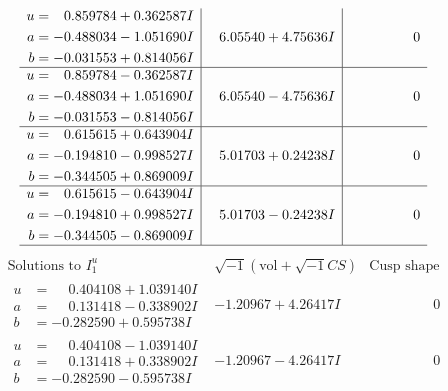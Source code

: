 \documentclass[1p]{elsarticle_modified}
\theoremstyle{definition}
\newcommand{\I}{\sqrt{-1}}
\begin{document}
$$\begin{array}{c|c|c}
\begin{aligned}
u &= \phantom{-}0.859784 + 0.362587 I \\
a &= -0.488034 - 1.051690 I \\
b &= -0.031553 + 0.814056 I\end{aligned}
 & \phantom{-}6.05540 + 4.75636 I & \phantom{-0.000000 } 0 \\ \hline\begin{aligned}
u &= \phantom{-}0.859784 - 0.362587 I \\
a &= -0.488034 + 1.051690 I \\
b &= -0.031553 - 0.814056 I\end{aligned}
 & \phantom{-}6.05540 - 4.75636 I & \phantom{-0.000000 } 0 \\ \hline\begin{aligned}
u &= \phantom{-}0.615615 + 0.643904 I \\
a &= -0.194810 - 0.998527 I \\
b &= -0.344505 + 0.869009 I\end{aligned}
 & \phantom{-}5.01703 + 0.24238 I & \phantom{-0.000000 } 0 \\ \hline\begin{aligned}
u &= \phantom{-}0.615615 - 0.643904 I \\
a &= -0.194810 + 0.998527 I \\
b &= -0.344505 - 0.869009 I\end{aligned}
 & \phantom{-}5.01703 - 0.24238 I & \phantom{-0.000000 } 0\\
 \hline 
 \end{array}$$\newpage$$\begin{array}{c|c|c}  
\text{Solutions to }I^u_{1}& \I (\text{vol} + \sqrt{-1}CS) & \text{Cusp shape}\\
 \hline 
\begin{aligned}
u &= \phantom{-}0.404108 + 1.039140 I \\
a &= \phantom{-}0.131418 - 0.338902 I \\
b &= -0.282590 + 0.595738 I\end{aligned}
 & -1.20967 + 4.26417 I & \phantom{-0.000000 } 0 \\ \hline\begin{aligned}
u &= \phantom{-}0.404108 - 1.039140 I \\
a &= \phantom{-}0.131418 + 0.338902 I \\
b &= -0.282590 - 0.595738 I\end{aligned}
 & -1.20967 - 4.26417 I & \phantom{-0.000000 } 0 \\ \hline\begin{aligned}

\end{aligned}
\end{array}$$
\end{document}
